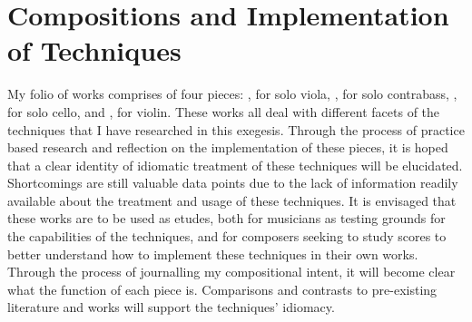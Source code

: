 
\chapter{Compositions and Implementation of Techniques}\label{ch:chapter3}




My folio of works comprises of four pieces: , for solo viola, , for solo contrabass, , for solo cello, and , for violin. 
These works all deal with different facets of the techniques that I have researched in this exegesis. 
Through the process of practice based research and reflection on the implementation of these pieces, it is hoped that a clear identity of idiomatic treatment of these techniques will be elucidated.
Shortcomings are still valuable data points due to the lack of information readily available about the treatment and usage of these techniques.
It is envisaged that these works are to be used as etudes, both for musicians as testing grounds for the capabilities of the techniques, and for composers seeking to study scores to better understand how to implement these techniques in their own works.
Through the process of journalling my compositional intent, it will become clear what the function of each piece is.
Comparisons and contrasts to pre-existing literature and works will support the techniques' idiomacy. 


